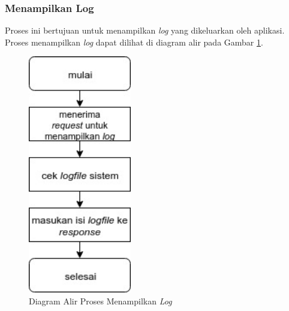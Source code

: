 \subsubsection{Menampilkan Log}
\par Proses ini bertujuan untuk menampilkan \textit{log} yang dikeluarkan oleh aplikasi. Proses menampilkan \textit{log} dapat dilihat di diagram alir pada Gambar \ref{fc:log}.
\begin{figure}[H]
	\centering\includegraphics[width=0.4\textwidth]{bab3/img/flowchart-menampilkan_log.jpg}
	\caption{Diagram Alir Proses Menampilkan \textit{Log}} \label{fc:log}
\end{figure}

